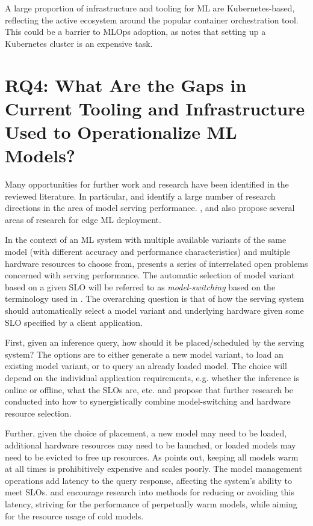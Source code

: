 A large proportion of infrastructure and tooling for ML are Kubernetes-based, reflecting the active ecosystem around the popular container orchestration tool.
This could be a barrier to MLOps adoption, as \textcite{Ruf2021} notes that setting up a Kubernetes cluster is an expensive task.

\section{RQ4: What Are the Gaps in Current Tooling and Infrastructure Used to Operationalize ML Models?}
\label{ch:research_results:rq4_gaps}

Many opportunities for further work and research have been identified in the reviewed literature.
In particular, \cite{Yadwadkar2019} and \cite{Zhang2020} identify a large number of research directions in the area of model serving performance.
\cite{Bosch2021}, \cite{Rausch2019} and \cite{Gupta2020} also propose several areas of research for edge ML deployment.

In the context of an ML system with multiple available variants of the same model (with different accuracy and performance characteristics) and multiple hardware resources to choose from, \cite{Yadwadkar2019} presents a series of interrelated open problems concerned with serving performance.
The automatic selection of model variant based on a given SLO will be referred to as \textit{model-switching} based on the terminology used in \cite{Zhang2020}. 
The overarching question is that of how the serving system should automatically select a model variant and underlying hardware given some SLO specified by a client application.

First, given an inference query, how should it be placed/scheduled by the serving system?
The options are to either generate a new model variant, to load an existing model variant, or to query an already loaded model.
The choice will depend on the individual application requirements, e.g. whether the inference is online or offline, what the SLOs are, etc.
\cite{Yadwadkar2019} and \cite{Zhang2020} propose that further research be conducted into how to synergistically combine model-switching and hardware resource selection.

Further, given the choice of placement, a new model may need to be loaded, additional hardware resources may need to be launched, or loaded models may need to be evicted to free up resources.
As \cite{Zhang2020} points out, keeping all models warm at all times is prohibitively expensive and scales poorly.
The model management operations add latency to the query response, affecting the system's ability to meet SLOs.
\cite{Yadwadkar2019} and \cite{Zhang2020} encourage research into methods for reducing or avoiding this latency, striving for the performance of perpetually warm models, while aiming for the resource usage of cold models.

